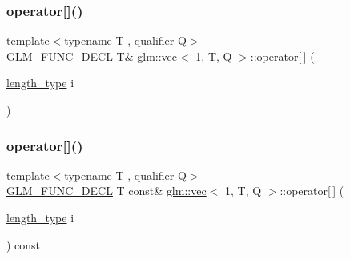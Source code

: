 \mbox{\label{structglm_1_1vec_3_011_00_01_t_00_01_q_01_4_a3ddc7f24ef7c4820534a14043fb51946}} 
\subsubsection{\texorpdfstring{operator[]()}{operator[]()}\hspace{0.1cm}{\footnotesize\ttfamily [1/2]}}
{\footnotesize\ttfamily template$<$typename T , qualifier Q$>$ \\
\hyperlink{setup_8hpp_ab2d052de21a70539923e9bcbf6e83a51}{G\+L\+M\+\_\+\+F\+U\+N\+C\+\_\+\+D\+E\+CL} T\& \hyperlink{structglm_1_1vec}{glm\+::vec}$<$ 1, T, Q $>$\+::operator\mbox{[}$\,$\mbox{]} (\begin{DoxyParamCaption}\item[{\hyperlink{structglm_1_1vec_3_011_00_01_t_00_01_q_01_4_a37415eee3b59cf93cdb752a2b30fe5e6}{length\+\_\+type}}]{i }\end{DoxyParamCaption})}

\mbox{\label{structglm_1_1vec_3_011_00_01_t_00_01_q_01_4_aca63447e88983b17ea1cb8698f9f8018}} 
\subsubsection{\texorpdfstring{operator[]()}{operator[]()}\hspace{0.1cm}{\footnotesize\ttfamily [2/2]}}
{\footnotesize\ttfamily template$<$typename T , qualifier Q$>$ \\
\hyperlink{setup_8hpp_ab2d052de21a70539923e9bcbf6e83a51}{G\+L\+M\+\_\+\+F\+U\+N\+C\+\_\+\+D\+E\+CL} T const\& \hyperlink{structglm_1_1vec}{glm\+::vec}$<$ 1, T, Q $>$\+::operator\mbox{[}$\,$\mbox{]} (\begin{DoxyParamCaption}\item[{\hyperlink{structglm_1_1vec_3_011_00_01_t_00_01_q_01_4_a37415eee3b59cf93cdb752a2b30fe5e6}{length\+\_\+type}}]{i }\end{DoxyParamCaption}) const}

